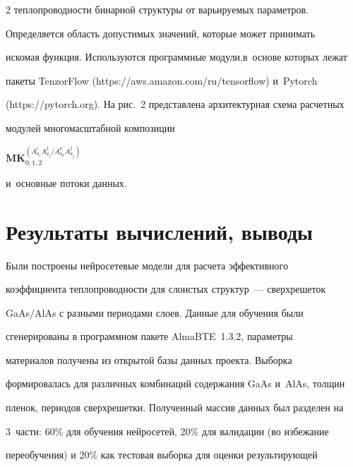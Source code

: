 \begin{multicols}{2}
теплопроводности бинарной структуры от варь\-и\-ру\-емых па\-ра\-мет\-ров. 


Определяется об\-ласть до\-пус\-ти\-мых значений, которые может принимать 


искомая функция. Используются программные модули,\linebreak в~основе которых лежат 


пакеты \mbox{TenzorFlow} ({\sf https://aws.amazon.com/ru/tensorflow}) и~\mbox{Pytorch} 


(https://pytorch.org). На рис.~2 пред\-став\-ле\-на архитектурная схема расчетных 


модулей многомасштабной композиции 


$\mathbf{MK}_{0,1,2}^{(A^i_{a_i}A^j_{a_j}/A^k_{a_k}A^j_{a_j})}$ 


и~основные потоки данных.


     





     


\section{Результаты вычислений, выводы}





\vspace*{-16pt}





    Были построены нейросетевые модели для расчета эффективного 


коэффициента теплопроводности для слоистых структур~--- сверхрешеток 


GaAs/AlAs с разными периодами слоев. Данные для обучения были 


сгенерированы в программном пакете \mbox{AlmaBTE}~1.3.2, параметры 


материалов получены из открытой базы данных проекта. Выборка 


формировалась для различных комбинаций содержания GaAs и~AlAs, толщин 


пленок, периодов сверхрешетки. Полученный массив данных был разделен на 


3~части: 60\% для обучения нейросетей, 20\% для валидации (во избежание 


переобучения) и 20\% как тестовая выборка для оценки результирующей 



\end{multicols}
